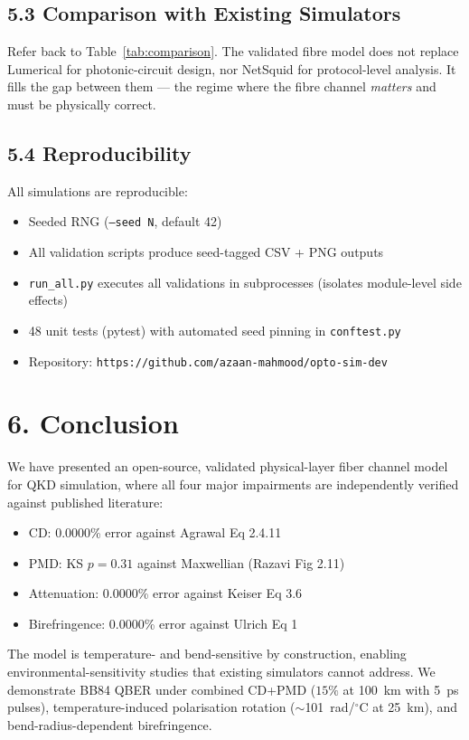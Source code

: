 \documentclass[11pt,a4paper]{article}
\begin{document}
\subsection{5.3 Comparison with Existing Simulators}
Refer back to Table~\ref{tab:comparison}.  The validated fibre model
does not replace Lumerical for photonic-circuit design, nor NetSquid for
protocol-level analysis.  It fills the gap between them --- the regime
where the fibre channel \emph{matters} and must be physically correct.

\subsection{5.4 Reproducibility}
All simulations are reproducible:
\begin{itemize}[nosep]
  \item Seeded RNG (\texttt{--seed N}, default 42)
  \item All validation scripts produce seed-tagged CSV + PNG outputs
  \item \texttt{run\_all.py} executes all validations in subprocesses
    (isolates module-level side effects)
  \item 48 unit tests (pytest) with automated seed pinning in
    \texttt{conftest.py}
  \item Repository: \texttt{https://github.com/azaan-mahmood/opto-sim-dev}
\end{itemize}

\section{6. Conclusion}

We have presented an open-source, validated physical-layer fiber channel
model for QKD simulation, where all four major impairments are
independently verified against published literature:
\begin{itemize}[nosep]
  \item CD: 0.0000\% error against Agrawal Eq 2.4.11
  \item PMD: KS $p=0.31$ against Maxwellian (Razavi Fig 2.11)
  \item Attenuation: 0.0000\% error against Keiser Eq 3.6
  \item Birefringence: 0.0000\% error against Ulrich Eq 1
\end{itemize}

The model is temperature- and bend-sensitive by construction, enabling
environmental-sensitivity studies that existing simulators cannot
address.  We demonstrate BB84 QBER under combined CD+PMD ($15\%$ at
100~km with 5~ps pulses), temperature-induced polarisation rotation
($\sim$101~rad/$^\circ$C at 25~km), and bend-radius-dependent
birefringence.
\end{document}
